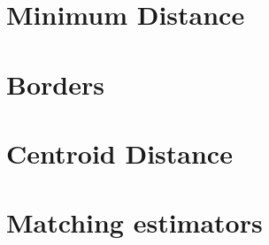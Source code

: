 \documentclass[10pt]{article}
\begin{document}









\clearpage\section{Minimum Distance}









\clearpage\section{Borders}









\clearpage\section{Centroid Distance}









\clearpage\section{Matching estimators}
\end{document}
